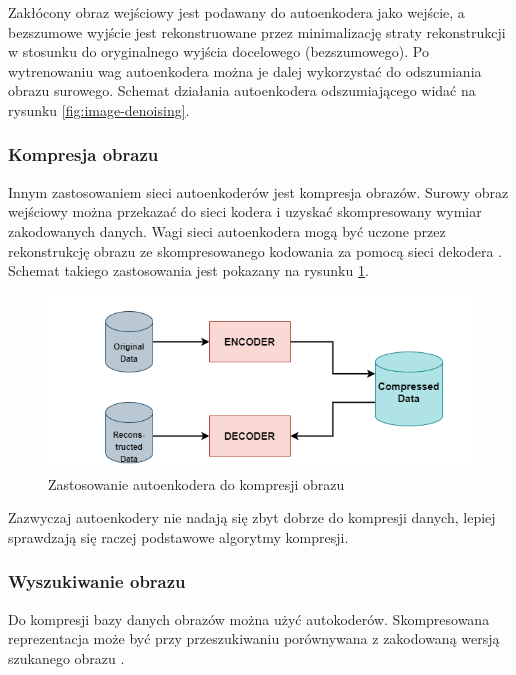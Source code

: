 \documentclass[12pt]{mwbk}
\theoremstyle{plain}
\theoremstyle{definition}
\theoremstyle{remark}
\newcommand\zrodlo[1]{\par\vspace{-3mm}{\small\textit{Źródło: }#1 }}
\begin{document}
Zakłócony obraz wejściowy jest podawany do autoenkodera jako wejście, a bezszumowe wyjście jest rekonstruowane przez minimalizację straty rekonstrukcji w stosunku do oryginalnego wyjścia docelowego (bezszumowego). Po wytrenowaniu wag autoenkodera można je dalej wykorzystać do odszumiania obrazu surowego. Schemat działania autoenkodera odszumiającego widać na rysunku \ref{fig:image-denoising}.

\subsubsection{Kompresja obrazu}

Innym zastosowaniem sieci autoenkoderów jest kompresja obrazów. Surowy obraz wejściowy można przekazać do sieci kodera i uzyskać skompresowany wymiar zakodowanych danych. Wagi sieci autoenkodera mogą być uczone przez rekonstrukcję obrazu ze skompresowanego kodowania za pomocą sieci dekodera \cite{kumar}. Schemat takiego zastosowania jest pokazany na rysunku \ref{fig:image-compression}.

\begin{figure}[!h]
	\centering
	\includegraphics[width=0.8\linewidth]{rys/image_compression.png}
	\caption{Zastosowanie autoenkodera do kompresji obrazu}
	\zrodlo{\cite{kumar}}
	\label{fig:image-compression}
\end{figure}

Zazwyczaj autoenkodery nie nadają się zbyt dobrze do kompresji danych, lepiej sprawdzają się raczej podstawowe algorytmy kompresji.

\subsubsection{Wyszukiwanie obrazu}

Do kompresji bazy danych obrazów można użyć autokoderów. Skompresowana reprezentacja może być przy przeszukiwaniu porównywana z zakodowaną wersją szukanego obrazu \cite{kumar}.
\end{document}
